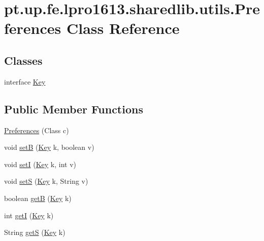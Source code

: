 \hypertarget{classpt_1_1up_1_1fe_1_1lpro1613_1_1sharedlib_1_1utils_1_1_preferences}{}\section{pt.\+up.\+fe.\+lpro1613.\+sharedlib.\+utils.\+Preferences Class Reference}
\label{classpt_1_1up_1_1fe_1_1lpro1613_1_1sharedlib_1_1utils_1_1_preferences}
\subsection*{Classes}
\begin{DoxyCompactItemize}
\item 
interface \hyperlink{interfacept_1_1up_1_1fe_1_1lpro1613_1_1sharedlib_1_1utils_1_1_preferences_1_1_key}{Key}
\end{DoxyCompactItemize}
\subsection*{Public Member Functions}
\begin{DoxyCompactItemize}
\item 
\hyperlink{classpt_1_1up_1_1fe_1_1lpro1613_1_1sharedlib_1_1utils_1_1_preferences_a627a5dd379de9b1b034761c585e4a87a}{Preferences} (Class c)
\item 
void \hyperlink{classpt_1_1up_1_1fe_1_1lpro1613_1_1sharedlib_1_1utils_1_1_preferences_a746848d01972f8874044aef35a8621cb}{setB} (\hyperlink{interfacept_1_1up_1_1fe_1_1lpro1613_1_1sharedlib_1_1utils_1_1_preferences_1_1_key}{Key} k, boolean v)
\item 
void \hyperlink{classpt_1_1up_1_1fe_1_1lpro1613_1_1sharedlib_1_1utils_1_1_preferences_ad1e7c0fc12af226ce437da9ea8bd84f3}{setI} (\hyperlink{interfacept_1_1up_1_1fe_1_1lpro1613_1_1sharedlib_1_1utils_1_1_preferences_1_1_key}{Key} k, int v)
\item 
void \hyperlink{classpt_1_1up_1_1fe_1_1lpro1613_1_1sharedlib_1_1utils_1_1_preferences_a7ef4c07c94b75f3bb5cf27c4533f01b6}{setS} (\hyperlink{interfacept_1_1up_1_1fe_1_1lpro1613_1_1sharedlib_1_1utils_1_1_preferences_1_1_key}{Key} k, String v)
\item 
boolean \hyperlink{classpt_1_1up_1_1fe_1_1lpro1613_1_1sharedlib_1_1utils_1_1_preferences_ad42ac07907c3bb6066925a1de8706007}{getB} (\hyperlink{interfacept_1_1up_1_1fe_1_1lpro1613_1_1sharedlib_1_1utils_1_1_preferences_1_1_key}{Key} k)
\item 
int \hyperlink{classpt_1_1up_1_1fe_1_1lpro1613_1_1sharedlib_1_1utils_1_1_preferences_a6b5169368a838aca6c6880826294aea7}{getI} (\hyperlink{interfacept_1_1up_1_1fe_1_1lpro1613_1_1sharedlib_1_1utils_1_1_preferences_1_1_key}{Key} k)
\item 
String \hyperlink{classpt_1_1up_1_1fe_1_1lpro1613_1_1sharedlib_1_1utils_1_1_preferences_aada2e7f8fe94b6a7ef78cfb30637b982}{getS} (\hyperlink{interfacept_1_1up_1_1fe_1_1lpro1613_1_1sharedlib_1_1utils_1_1_preferences_1_1_key}{Key} k)
\end{DoxyCompactItemize}


